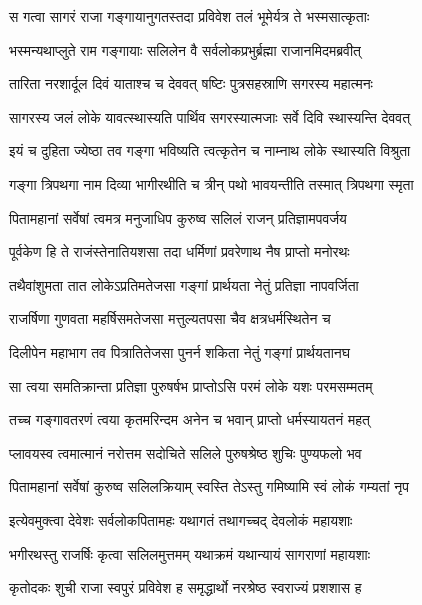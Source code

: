 
\twolineshloka
{स गत्वा सागरं राजा गङ्गायानुगतस्तदा}
{प्रविवेश तलं भूमेर्यत्र ते भस्मसात्कृताः} %

\twolineshloka
{भस्मन्यथाप्लुते राम गङ्गायाः सलिलेन वै}
{सर्वलोकप्रभुर्ब्रह्मा राजानमिदमब्रवीत्} %

\twolineshloka
{तारिता नरशार्दूल दिवं याताश्च च देववत्}
{षष्टिः पुत्रसहस्राणि सगरस्य महात्मनः} %

\twolineshloka
{सागरस्य जलं लोके यावत्स्थास्यति पार्थिव}
{सगरस्यात्मजाः सर्वे दिवि स्थास्यन्ति देववत्} %

\twolineshloka
{इयं च दुहिता ज्येष्ठा तव गङ्गा भविष्यति}
{त्वत्कृतेन च नाम्नाथ लोके स्थास्यति विश्रुता} %

\twolineshloka
{गङ्गा त्रिपथगा नाम दिव्या भागीरथीति च}
{त्रीन् पथो भावयन्तीति तस्मात् त्रिपथगा स्मृता} %

\twolineshloka
{पितामहानां सर्वेषां त्वमत्र मनुजाधिप}
{कुरुष्व सलिलं राजन् प्रतिज्ञामपवर्जय} %

\twolineshloka
{पूर्वकेण हि ते राजंस्तेनातियशसा तदा}
{धर्मिणां प्रवरेणाथ नैष प्राप्तो मनोरथः} %

\twolineshloka
{तथैवांशुमता तात लोकेऽप्रतिमतेजसा}
{गङ्गां प्रार्थयता नेतुं प्रतिज्ञा नापवर्जिता} %

\twolineshloka
{राजर्षिणा गुणवता महर्षिसमतेजसा}
{मत्तुल्यतपसा चैव क्षत्रधर्मस्थितेन च} %

\twolineshloka
{दिलीपेन महाभाग तव पित्रातितेजसा}
{पुनर्न शकिता नेतुं गङ्गां प्रार्थयतानघ} %

\twolineshloka
{सा त्वया समतिक्रान्ता प्रतिज्ञा पुरुषर्षभ}
{प्राप्तोऽसि परमं लोके यशः परमसम्मतम्} %

\twolineshloka
{तच्च गङ्गावतरणं त्वया कृतमरिन्दम}
{अनेन च भवान् प्राप्तो धर्मस्यायतनं महत्} %

\twolineshloka
{प्लावयस्व त्वमात्मानं नरोत्तम सदोचिते}
{सलिले पुरुषश्रेष्ठ शुचिः पुण्यफलो भव} %

\twolineshloka
{पितामहानां सर्वेषां कुरुष्व सलिलक्रियाम्}
{स्वस्ति तेऽस्तु गमिष्यामि स्वं लोकं गम्यतां नृप} %

\twolineshloka
{इत्येवमुक्त्वा देवेशः सर्वलोकपितामहः}
{यथागतं तथागच्चद् देवलोकं महायशाः} %

\twolineshloka
{भगीरथस्तु राजर्षिः कृत्वा सलिलमुत्तमम्}
{यथाक्रमं यथान्यायं सागराणां महायशाः} %

\twolineshloka
{कृतोदकः शुची राजा स्वपुरं प्रविवेश ह}
{समृद्धार्थो नरश्रेष्ठ स्वराज्यं प्रशशास ह} %

